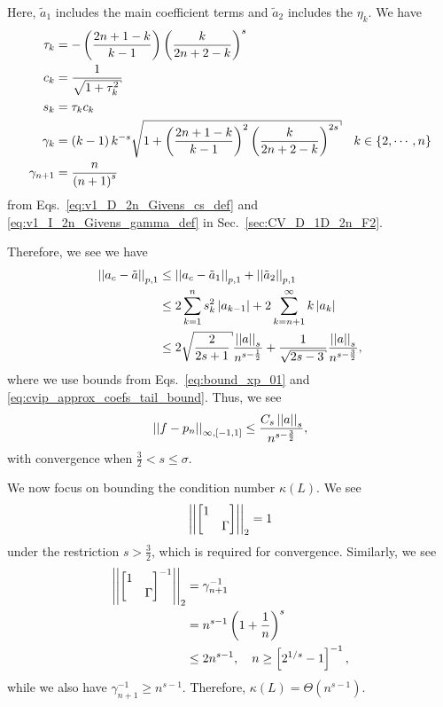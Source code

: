 %
Here, $\tilde{a}_{1}$ includes the main coefficient terms and $\tilde{a}_{2}$
includes the $\eta_{k}$.
We have
%
\begin{align}
    \tau_{k} &= -\parens{\frac{2n+1-k}{k-1}}\parens{\frac{k}{2n+2-k}}^{s}
        \nonumber\\
    c_{k} &= \frac{1}{\sqrt{1+\tau_{k}^{2}}} \nonumber\\
    s_{k} &= \tau_{k}c_{k} \nonumber\\
    \gamma_{k} &= \parens{k-1}k^{-s}\sqrt{1 + \parens{\frac{2n+1-k}{k-1}}^{2}
        \parens{\frac{k}{2n+2-k}}^{2s}} \quad k\in\braces{2,\cdots,n}
        \nonumber\\
    \gamma_{n+1} &= \frac{n}{\parens{n+1}^{s}}
\end{align}
%
from Eqs.~\eqref{eq:v1_D_2n_Givens_cs_def}
and \eqref{eq:v1_I_2n_Givens_gamma_def} in
Sec.~\ref{sec:CV_D_1D_2n_F2}.

Therefore, we see we have
%
\begin{align}
    \norm{a_{c} - \tilde{a}}_{p,1} &\le \norm{a_{c}-\tilde{a}_{1}}_{p,1}
        + \norm{\tilde{a}_{2}}_{p,1} \nonumber\\
    &\le 2\sum_{k=1}^{n}s_{k}^{2}\abs{a_{k-1}}
        + 2\sum_{k=n+1}^{\infty} k\abs{a_{k}} \nonumber\\
    &\le 2\sqrt{\frac{2}{2s+1}}\frac{\norm{a}_{s}}{n^{s-\frac{1}{2}}}
        + \frac{1}{\sqrt{2s-3}}\frac{\norm{a}_{s}}{n^{s-\frac{3}{2}}},
\end{align}
%
where we use bounds from Eqs.~\eqref{eq:bound_xp_01} and 
\eqref{eq:cvip_approx_coefs_tail_bound}.
Thus, we see
%
\begin{equation}
    \left| \left| f-p_{n} \right| \right|_{\infty,[-1,1]}
        \le \frac{C_{s}\left| \left| a \right| \right|_{s}}{n^{s-\frac{3}{2}}},
\end{equation}
%
with convergence when $\frac{3}{2} < s \le \sigma$.



We now focus on bounding the condition number $\kappa(L)$.
We see
%
\begin{equation}
    \left| \left| \begin{bmatrix} 1 & \\ & \Gamma \end{bmatrix} \right| \right|_{2} = 1
\end{equation}
%
under the restriction $s>\frac{3}{2}$, which is required for convergence.
Similarly, we see
%
\begin{align}
    \left| \left| \begin{bmatrix} 1 & \\ & \Gamma \end{bmatrix}^{-1} \right| \right|_{2} 
        &= \gamma_{n+1}^{-1} \nonumber\\
    &= n^{s-1}\left( 1+\frac{1}{n} \right)^{s} \nonumber\\
    &\le 2n^{s-1}, \quad n\ge \left[ 2^{1/s}-1 \right]^{-1},
\end{align}
%
while we also have $\gamma_{n+1}^{-1} \ge n^{s-1}$.
Therefore, $\kappa(L) = \Theta(n^{s-1})$.



